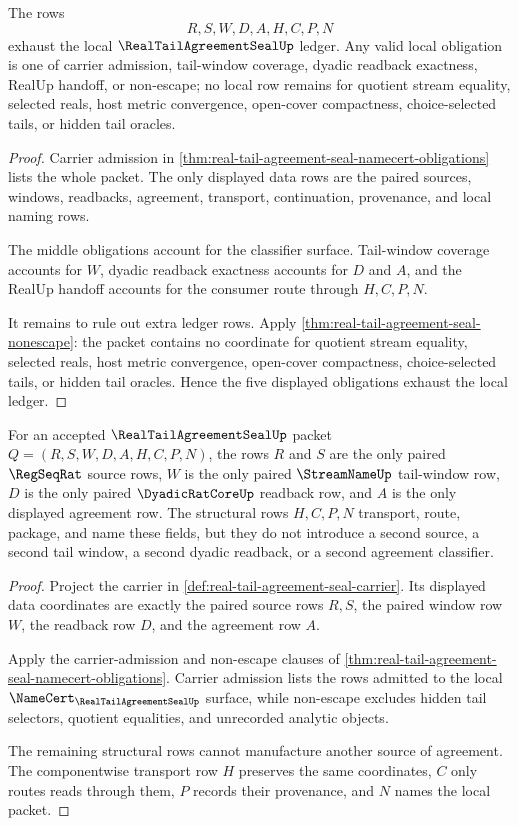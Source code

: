 \begin{theorem}
\label{thm:real-tail-agreement-seal-ledger-exhaustion}
The rows
$$
R,S,W,D,A,H,C,P,N
$$
exhaust the local $\RealTailAgreementSealUp$ ledger. Any valid local obligation is one of carrier admission, tail-window coverage, dyadic readback exactness, RealUp handoff, or non-escape; no local row remains for quotient stream equality, selected reals, host metric convergence, open-cover compactness, choice-selected tails, or hidden tail oracles.
\end{theorem}
\begin{proof}
Carrier admission in \autoref{thm:real-tail-agreement-seal-namecert-obligations} lists the whole packet. The only displayed data rows are the paired sources, windows, readbacks, agreement, transport, continuation, provenance, and local naming rows.

The middle obligations account for the classifier surface. Tail-window coverage accounts for $W$, dyadic readback exactness accounts for $D$ and $A$, and the RealUp handoff accounts for the consumer route through $H,C,P,N$.

It remains to rule out extra ledger rows. Apply \autoref{thm:real-tail-agreement-seal-nonescape}: the packet contains no coordinate for quotient stream equality, selected reals, host metric convergence, open-cover compactness, choice-selected tails, or hidden tail oracles. Hence the five displayed obligations exhaust the local ledger.
\end{proof}

\begin{theorem}
\label{thm:real-tail-agreement-seal-source-separation-obligation}
For an accepted $\RealTailAgreementSealUp$ packet $Q=(R,S,W,D,A,H,C,P,N)$, the rows $R$ and $S$ are the only paired $\RegSeqRat$ source rows, $W$ is the only paired $\StreamNameUp$ tail-window row, $D$ is the only paired $\DyadicRatCoreUp$ readback row, and $A$ is the only displayed agreement row. The structural rows $H,C,P,N$ transport, route, package, and name these fields, but they do not introduce a second source, a second tail window, a second dyadic readback, or a second agreement classifier.
\end{theorem}
\begin{proof}
Project the carrier in \autoref{def:real-tail-agreement-seal-carrier}. Its displayed data coordinates are exactly the paired source rows $R,S$, the paired window row $W$, the readback row $D$, and the agreement row $A$.

Apply the carrier-admission and non-escape clauses of \autoref{thm:real-tail-agreement-seal-namecert-obligations}. Carrier admission lists the rows admitted to the local $\NameCert_{\RealTailAgreementSealUp}$ surface, while non-escape excludes hidden tail selectors, quotient equalities, and unrecorded analytic objects.

The remaining structural rows cannot manufacture another source of agreement. The componentwise transport row $H$ preserves the same coordinates, $C$ only routes reads through them, $P$ records their provenance, and $N$ names the local packet.
\end{proof}


